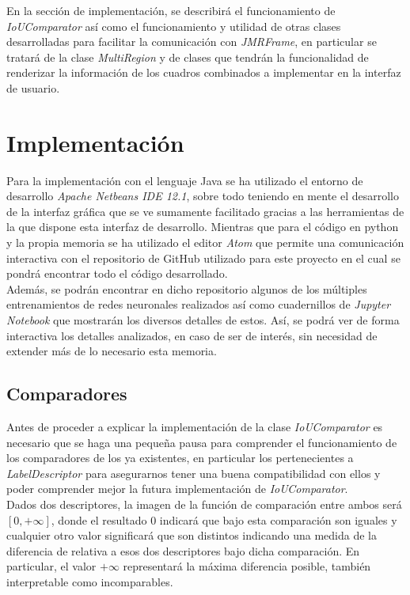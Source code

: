 En la sección de implementación, se describirá el funcionamiento de \emph{IoUComparator} así como el funcionamiento y utilidad de otras clases desarrolladas para facilitar la comunicación con \emph{JMRFrame}, en particular se tratará de la clase \emph{MultiRegion} y de clases que tendrán la funcionalidad de renderizar la información de los cuadros combinados a implementar en la interfaz de usuario.

\chapter{Implementación}
Para la implementación con el lenguaje Java se ha utilizado el entorno de desarrollo \emph{Apache Netbeans IDE 12.1}, sobre todo teniendo en mente el desarrollo de la interfaz gráfica que se ve sumamente facilitado gracias a las herramientas de la que dispone esta interfaz de desarrollo. Mientras que para el código en python y la propia memoria se ha utilizado el editor \emph{Atom} que permite una comunicación interactiva con el repositorio de GitHub utilizado para este proyecto \cite{GitHub} en el cual se pondrá encontrar todo el código desarrollado.\\

Además, se podrán encontrar en dicho repositorio algunos de los múltiples entrenamientos de redes neuronales realizados así como cuadernillos de \emph{Jupyter Notebook} que mostrarán los diversos detalles de estos. Así, se podrá ver de forma interactiva los detalles analizados, en caso de ser de interés, sin necesidad de extender más de lo necesario esta memoria.
\section{Comparadores}

Antes de proceder a explicar la implementación de la clase \emph{IoUComparator} es necesario que se haga una pequeña pausa para comprender el funcionamiento de los comparadores de los ya existentes, en particular los pertenecientes a \emph{LabelDescriptor} para asegurarnos tener una buena compatibilidad con ellos y poder comprender mejor la futura implementación de \emph{IoUComparator}.\\

Dados dos descriptores, la imagen de la función de comparación entre ambos será $[0,+\infty]$, donde el resultado $0$ indicará que bajo esta comparación son iguales y cualquier otro valor significará que son distintos indicando una medida de la diferencia de relativa a esos dos descriptores bajo dicha comparación. En particular, el valor $+\infty$ representará la máxima diferencia posible, también interpretable como incomparables.\\

